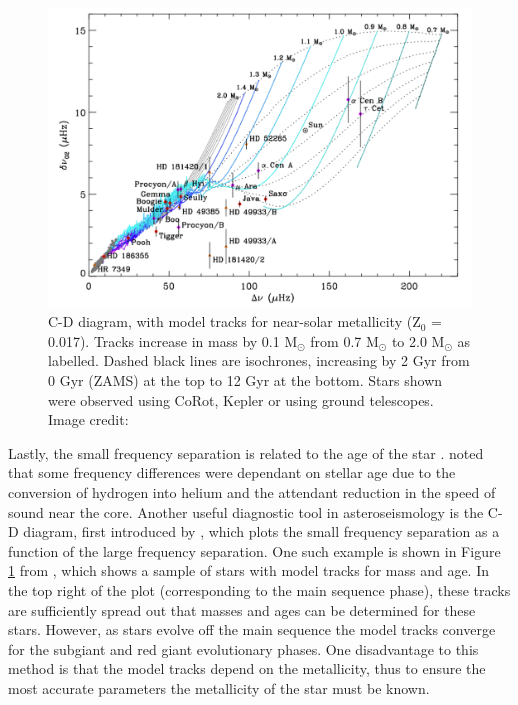 \begin{figure}
    \centering
    \includegraphics[scale=0.4]{Figures/1-Introduction/C-D_diagram.pdf}
    \caption[C-D diagram that can be used to age stars from asteroseismic parameters]{C-D diagram, with model tracks for near-solar metallicity (Z$_{0}$ = 0.017). Tracks increase in mass by 0.1 M$_{\odot}$ from 0.7 M$_{\odot}$ to 2.0 M$_{\odot}$ as labelled. Dashed black lines are isochrones, increasing by 2 Gyr from 0 Gyr (ZAMS) at the top to 12 Gyr at the bottom. Stars shown were observed using CoRot, Kepler or using ground telescopes. Image credit: \citet{White_etal_2011}}
    \label{fig:CD_diagram_example}
\end{figure}

Lastly, the small frequency separation is related to the age of the star \citep{Ulrich_1986}. \citet{Christensen_Dalsgaard_1984} noted that some frequency differences were dependant on stellar age due to the conversion of hydrogen into helium and the attendant reduction in the speed of sound near the core. Another useful diagnostic tool in asteroseismology is the C-D diagram, first introduced by \citet{Christensen_Dalsgaard_1984}, which plots the small frequency separation as a function of the large frequency separation. One such example is shown in Figure \ref{fig:CD_diagram_example} from \citet{White_etal_2011}, which shows a sample of stars with model tracks for mass and age. In the top right of the plot (corresponding to the main sequence phase), these tracks are sufficiently spread out that masses and ages can be determined for these stars. However, as stars evolve off the main sequence the model tracks converge for the subgiant and red giant evolutionary phases. One disadvantage to this method is that the model tracks depend on the metallicity, thus to ensure the most accurate parameters the metallicity of the star must be known.

